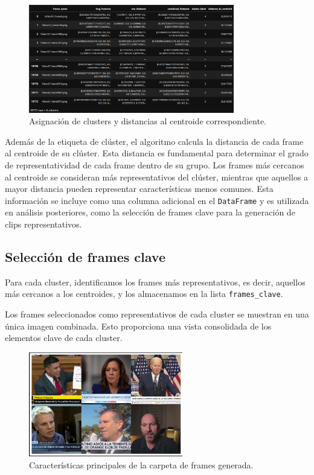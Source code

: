 \begin{figure}[H]
    \centering
    \includegraphics[width=0.80\textwidth]{4/figures/KNN_1.png}
    \caption{Asignación de clusters y distancias al centroide correspondiente.}
    \label{fig:convolucion}
\end{figure}

Además de la etiqueta de clúster, el algoritmo calcula la distancia de cada frame al centroide de su clúster. Esta distancia es fundamental para determinar el grado de representatividad de cada frame dentro de su grupo. Los frames más cercanos al centroide se consideran más representativos del clúster, mientras que aquellos a mayor distancia pueden representar características menos comunes. Esta información se incluye como una columna adicional en el \texttt{DataFrame} y es utilizada en análisis posteriores, como la selección de frames clave para la generación de clips representativos.


\subsection{Selección de frames clave}
Para cada cluster, identificamos los frames más representativos, es decir, aquellos más cercanos a los centroides, y los almacenamos en la lista \texttt{frames\_clave}.

Los frames seleccionados como representativos de cada cluster se muestran en una única imagen combinada. Esto proporciona una vista consolidada de los elementos clave de cada cluster.

\begin{figure}[H]
    \centering
    \includegraphics[width=0.60\textwidth]{4/figures/Frames_1.png}
    \caption{Características principales de la carpeta de frames generada.}
    \label{fig:convolucion}
\end{figure}

